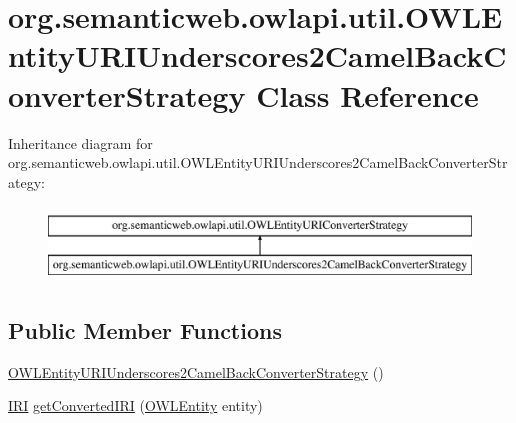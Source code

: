 \hypertarget{classorg_1_1semanticweb_1_1owlapi_1_1util_1_1_o_w_l_entity_u_r_i_underscores2_camel_back_converter_strategy}{\section{org.\-semanticweb.\-owlapi.\-util.\-O\-W\-L\-Entity\-U\-R\-I\-Underscores2\-Camel\-Back\-Converter\-Strategy Class Reference}
\label{classorg_1_1semanticweb_1_1owlapi_1_1util_1_1_o_w_l_entity_u_r_i_underscores2_camel_back_converter_strategy}
}
Inheritance diagram for org.\-semanticweb.\-owlapi.\-util.\-O\-W\-L\-Entity\-U\-R\-I\-Underscores2\-Camel\-Back\-Converter\-Strategy\-:\begin{figure}[H]
\begin{center}
\leavevmode
\includegraphics[height=2.000000cm]{classorg_1_1semanticweb_1_1owlapi_1_1util_1_1_o_w_l_entity_u_r_i_underscores2_camel_back_converter_strategy}
\end{center}
\end{figure}
\subsection*{Public Member Functions}
\begin{DoxyCompactItemize}
\item 
\hyperlink{classorg_1_1semanticweb_1_1owlapi_1_1util_1_1_o_w_l_entity_u_r_i_underscores2_camel_back_converter_strategy_a223529288d3e9f73aef68e3f90dfe8fb}{O\-W\-L\-Entity\-U\-R\-I\-Underscores2\-Camel\-Back\-Converter\-Strategy} ()
\item 
\hyperlink{classorg_1_1semanticweb_1_1owlapi_1_1model_1_1_i_r_i}{I\-R\-I} \hyperlink{classorg_1_1semanticweb_1_1owlapi_1_1util_1_1_o_w_l_entity_u_r_i_underscores2_camel_back_converter_strategy_aea4cbe48cf4a6ccf49fe140e42ab899c}{get\-Converted\-I\-R\-I} (\hyperlink{interfaceorg_1_1semanticweb_1_1owlapi_1_1model_1_1_o_w_l_entity}{O\-W\-L\-Entity} entity)
\end{DoxyCompactItemize}

